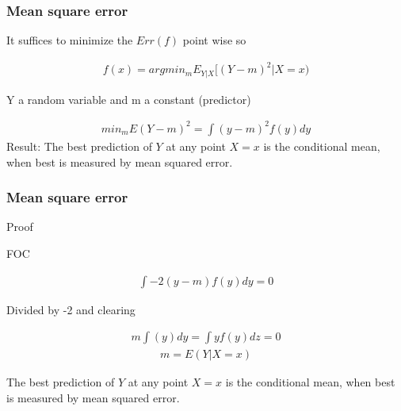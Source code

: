 \documentclass[
  shownotes,
  xcolor={svgnames},
  hyperref={colorlinks,citecolor=DarkBlue,linkcolor=DarkRed,urlcolor=DarkBlue}
  ]{beamer}
\begin{document}
\begin{frame}
\frametitle{Mean square error}

It suffices to minimize  the $Err(f)$ point wise so

\begin{align}
f(x)= argmin_m E_{Y|X} [(Y-m)^2|X=x)
\end{align}

Y a random variable and m a constant (predictor)

\begin{align}
min_m E(Y-m)^2= \int (y-m)^2  f(y)dy 
\end{align}
Result: The best prediction of $Y$ at any point $X = x$ is the conditional mean, when best is measured by mean squared error. 

\end{frame}

\begin{frame}
\frametitle{Mean square error}
Proof

FOC 

\begin{align}
\int -2 (y-m)  f(y)  dy =0 
\end{align}

Divided by -2 and clearing

\begin{align}
 m \int (y) dy = \int y f(y)  dz =0 
\end{align}
\begin{align}
m=E(Y|X=x) 
\end{align}


The best prediction of $Y$ at any point $X = x$ is the conditional mean, when best is measured by mean squared error.
\end{frame}
\end{document}
